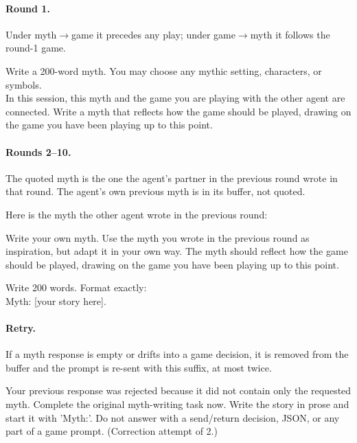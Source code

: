 \paragraph{Round 1.} Under myth$\rightarrow$game it precedes any play; under game$\rightarrow$myth it follows the round-1 game.
\begin{promptbox}
Write a 200-word myth. You may choose any mythic setting, characters, or symbols.\\
In this session, this myth and the game you are playing with the other agent are connected. Write a myth that reflects how the game should be played, drawing on the game you have been playing up to this point.
\end{promptbox}

\paragraph{Rounds 2--10.} The quoted myth is the one the agent's partner in the previous round wrote in that round. The agent's own previous myth is in its buffer, not quoted.
\begin{promptbox}
Here is the myth the other agent wrote in the previous round:\\

Write your own myth. Use the myth you wrote in the previous round as inspiration, but adapt it in your own way. The myth should reflect how the game should be played, drawing on the game you have been playing up to this point.

Write 200 words. Format exactly:\\
Myth: [your story here].
\end{promptbox}

\paragraph{Retry.} If a myth response is empty or drifts into a game decision, it is removed from the buffer and the prompt is re-sent with this suffix, at most twice.
\begin{promptbox}

Your previous response was rejected because it did not contain only the requested myth. Complete the original myth-writing task now. Write the story in prose and start it with 'Myth:'. Do not answer with a send/return decision, JSON, or any part of a game prompt. (Correction attempt  of 2.)
\end{promptbox}

